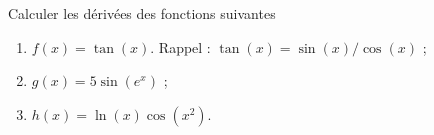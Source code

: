 \begin{exercice}\label{exoEC-0003}
  
 Calculer les dérivées des fonctions suivantes 
 \begin{enumerate}
 \item $f(x)=\tan(x)$. Rappel : $\tan(x)=\sin(x)/\cos(x)$ ;
 \item $g(x)=5\sin(e^{x})$ ;
 \item $h(x)=\ln(x)\cos(x^2)$.
 \end{enumerate}
\end{exercice}
